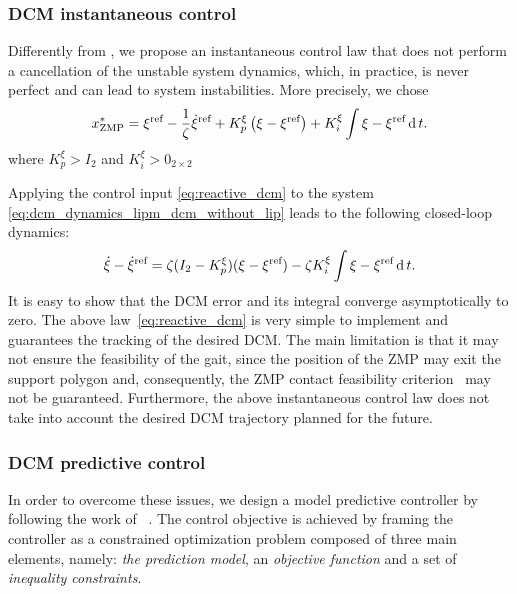 \subsubsection{DCM instantaneous control}
\label{instantaneous-control}

Differently from \cite{Englsberger2015}, we propose an instantaneous control law that does not perform a cancellation of the unstable system dynamics, which, in practice, is never perfect and can lead to system instabilities. More precisely, we chose
\begin{equation}
\label{eq:reactive_dcm}
x_\text{ZMP}^{*} = \xi^{\text{ref}}- \frac{1}{\zeta} \dot{\xi}^{\text{ref}}+ K^{\xi}_{p} \left(\xi - \xi^\text{ref} \right) + K^{\xi}_{i} \int{\xi - \xi^\text{ref} \operatorname{d}t}.
\end{equation}
where $K^{\xi}_{p}> I_2$ and $K^{\xi}_{i} > 0_{2\times2}$
\par
Applying the control input \eqref{eq:reactive_dcm} to the system \eqref{eq:dcm_dynamics_lipm_dcm_without_lip} leads to the following closed-loop dynamics:
\begin{equation}
\label{eq:reactive_cl}
\dot{\xi} - \dot{\xi}^{\text{ref}} = \zeta(I_2 - K^{\xi}_{p})  (\xi - \xi^{\text{ref}})
-\zeta K^{\xi}_{i}  \int{\xi - \xi^{\text{ref}} \operatorname{d}t}.
\end{equation}
It is easy to show that the DCM error and its integral converge asymptotically to zero.
The above law~\eqref{eq:reactive_dcm} is very simple to implement and guarantees the tracking of the
desired DCM. 
The main limitation is that it may not ensure the feasibility of the gait, since the position of the ZMP may exit the support polygon and, consequently, the ZMP contact feasibility criterion~\citep{Vukobratovic1969} may not be guaranteed.
Furthermore, the above instantaneous control law does not take into account the desired DCM trajectory planned for the future.

\subsubsection{DCM predictive control}
\label{predictive-control}
In order to overcome these issues, we design a model predictive controller by following the work of ~\cite{Krause2012}. 
The control objective is achieved by framing the controller as a constrained optimization problem composed of three
main elements, namely: \emph{the prediction model}, an \emph{objective
function} and a set of \emph{inequality constraints}.

